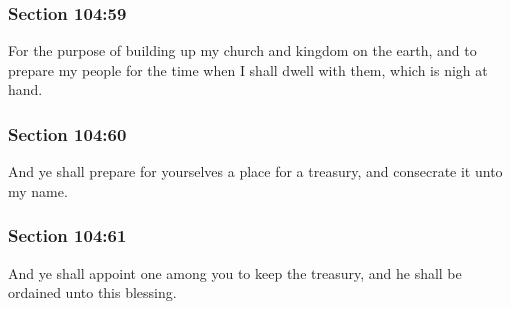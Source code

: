	\subsubsection{Section 104:59} %
		\label{DC104-59}

		For the purpose of building up my church and kingdom on the earth, and to prepare my people for the time when I shall dwell with them, which is nigh at hand.


	\subsubsection{Section 104:60} %
		\label{DC104-60}

		And ye shall prepare for yourselves a place for a treasury, and consecrate it unto my name.


	\subsubsection{Section 104:61} %
		\label{DC104-61}

		And ye shall appoint one among you to keep the treasury, and he shall be ordained unto this blessing.


